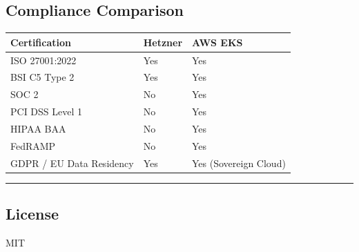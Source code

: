 \subsection{Compliance Comparison}\label{compliance-comparison}

{\def\LTcaptype{none} %
\begin{longtable}[]{@{}lll@{}}
\toprule\noalign{}
Certification & Hetzner & AWS EKS \\
\midrule\noalign{}
\endhead
\bottomrule\noalign{}
\endlastfoot
ISO 27001:2022 & Yes & Yes \\
BSI C5 Type 2 & Yes & Yes \\
SOC 2 & No & Yes \\
PCI DSS Level 1 & No & Yes \\
HIPAA BAA & No & Yes \\
FedRAMP & No & Yes \\
GDPR / EU Data Residency & Yes & Yes (Sovereign Cloud) \\
\end{longtable}
}

\begin{center}\rule{0.5\linewidth}{0.5pt}\end{center}

\subsection{License}\label{license}

MIT
